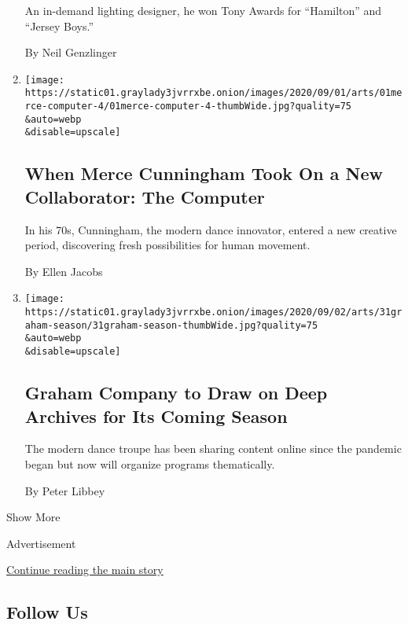 \begin{enumerate}
  An in-demand lighting designer, he won Tony Awards for ``Hamilton''
  and ``Jersey Boys.''

  By Neil Genzlinger
\item
  \href{/2020/09/01/arts/dance/merce-cunningham-computer-LifeForms.html}{}

  \texttt{[image: https://static01.graylady3jvrrxbe.onion/images/2020/09/01/arts/01merce-computer-4/01merce-computer-4-thumbWide.jpg?quality=75\\\&auto=webp\\\&disable=upscale]}

  \hypertarget{when-merce-cunningham-took-on-a-new-collaborator-the-computer}{%
  \subsection{When Merce Cunningham Took On a New Collaborator: The
  Computer}\label{when-merce-cunningham-took-on-a-new-collaborator-the-computer}}

  In his 70s, Cunningham, the modern dance innovator, entered a new
  creative period, discovering fresh possibilities for human movement.

  By Ellen Jacobs
\item
  \href{/2020/09/01/arts/dance/01martha-graham-virtual-season.html}{}

  \texttt{[image: https://static01.graylady3jvrrxbe.onion/images/2020/09/02/arts/31graham-season/31graham-season-thumbWide.jpg?quality=75\\\&auto=webp\\\&disable=upscale]}

  \hypertarget{graham-company-to-draw-on-deep-archives-for-its-coming-season}{%
  \subsection{Graham Company to Draw on Deep Archives for Its Coming
  Season}\label{graham-company-to-draw-on-deep-archives-for-its-coming-season}}

  The modern dance troupe has been sharing content online since the
  pandemic began but now will organize programs thematically.

  By Peter Libbey
\end{enumerate}

Show More

Advertisement

\protect\hyperlink{after-mid2}{Continue reading the main story}

\hypertarget{follow-us}{%
\subsection{Follow Us}\label{follow-us}}

